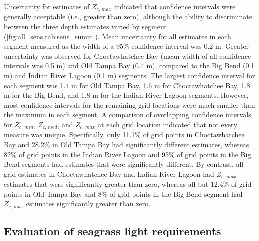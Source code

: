 \documentclass[letterpaper,12pt,oneside]{article}\usepackage[]{graphicx}\usepackage[]{color}
\begin{document}
Uncertainty for estimates of $Z_{c,\,max}$ indicated that confidence intervals were generally acceptable (i.e., greater than zero), although the ability to discriminate between the three depth estimates varied by segment (\cref{fig:all_sens,tab:sens_summ}).  Mean uncertainty for all estimates in each segment measured as the width of a 95\% confidence interval was 0.2 m.  Greater uncertainty was observed for Choctawhatchee Bay (mean width of all confidence intervals was 0.5 m) and Old Tampa Bay (0.4 m), compared to the Big Bend (0.1 m) and Indian River Lagoon (0.1 m) segments.  The largest confidence interval for each segment was 1.4 m for Old Tampa Bay, 1.6 m for Choctawhatchee Bay, 1.8 m for the Big Bend, and 1.8 m for the Indian River Lagoon segments.  However, most confidence intervals for the remaining grid locations were much smaller than the maximum in each segment.  A comparison of overlapping confidence intervals for $Z_{c,\,min}$, $Z_{c,\,med}$, and $Z_{c,\,max}$ at each grid location indicated that not every measure was unique.  Specifically, only 11.1\% of grid points in Choctawhatchee Bay and 28.2\% in Old Tampa Bay had significantly different estimates, whereas 82\% of grid points in the Indian River Lagoon and 95\% of grid points in the Big Bend segments had estimates that were significantly different.  By contrast, all grid estimates in Choctawhatchee Bay and Indian River Lagoon had $Z_{c,\,max}$ estimates that were significantly greater than zero, whereas all but 12.4\% of grid points in Old Tampa Bay and 8\% of grid points in the Big Bend segment had $Z_{c,\,max}$ estimates significantly greater than zero. 

\subsection{Evaluation of seagrass light requirements}



\end{document}
